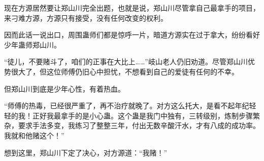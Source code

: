 \begin{this_body}
现在方源居然要让郑山川完全出题，也就是说，郑山川尽管拿自己最拿手的项目，来刁难方源，方源只有接受，没有任何改变的权利。

因而此话一说出口，周围蛊师们都是惊呼一片，暗道方源实在过于拿大，纷纷看好少年蛊师郑山川。

“徒儿，不要赌斗了，咱们的正事在大比上……”岐山老人仍旧劝道。尽管郑山川优势很大了，但这位师傅仍旧心中担忧，不想看到自己的爱徒有任何的不幸。

但郑山川到底是少年心性，有着热血。

“师傅的热毒，已经很严重了，再不治疗就晚了。对方这么托大，是看不起年纪轻轻的我！正好我最拿手的是小心蛊。这个蛊是我门中独有，三转级别，炼制步骤繁杂，要求手法多变，我练习了整整三年，付出无数辛酸汗水，才有八成的成功率。我就和他赌这个！”

想到这里，郑山川下定了决心，对方源道：“我赌！”

\end{this_body}

